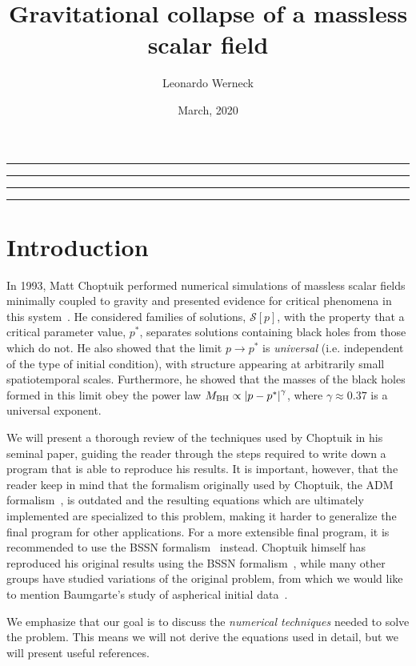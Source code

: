 \documentclass[a4paper,11pt]{article}
\title{Gravitational collapse of a massless scalar field}
\author{Leonardo Werneck}
\date{March, 2020}
\newcommand{\g}{\gamma}
\renewcommand{\S}{\mathcal{S}}
\newcommand{\lrsquare}[1]{\left[ #1 \right]}
\newcommand{\abs}[1]{\left| #1 \right|}
\newcommand{\ctr}[1]{
  \begin{center}
    #1
  \end{center}
}
\begin{document}
\maketitle

\ctr{\rule{\textwidth}{1pt}}
\tableofcontents
\ctr{\rule{\textwidth}{1pt}}
\listoffigures
\ctr{\rule{\textwidth}{1pt}}
\listoftables
\ctr{\rule{\textwidth}{1pt}}


\section{Introduction}

In 1993, Matt Choptuik performed numerical simulations of massless scalar fields minimally coupled to gravity and presented evidence for critical phenomena in this system~\cite{PhysRevLett.70.9}. He considered families of solutions, $\S\lrsquare{p}$, with the property that a critical parameter value, $p^{*}$, separates solutions containing black holes from those which do not. He also showed that the limit $p\to p^{*}$ is \emph{universal} (i.e. independent of the type of initial condition), with structure appearing at arbitrarily small spatiotemporal scales. Furthermore, he showed that the masses of the black holes formed in this limit obey the power law $M_{\rm BH} \propto \abs{p-p^{*}}^{\g}$, where $\g\approx0.37$ is a universal exponent.

We will present a thorough review of the techniques used by Choptuik in his seminal paper, guiding the reader through the steps required to write down a program that is able to reproduce his results. It is important, however, that the reader keep in mind that the formalism originally used by Choptuik, the ADM formalism~\cite{Arnowitt:1959ah}, is outdated and the resulting equations which are ultimately implemented are specialized to this problem, making it harder to generalize the final program for other applications. For a more extensible final program, it is recommended to use the BSSN formalism~\cite{shibata1995evolution,baumgarte1998numerical} instead. Choptuik himself has reproduced his original results using the BSSN formalism~\cite{PhysRevD.92.084037}, while many other groups have studied variations of the original problem, from which we would like to mention Baumgarte's study of aspherical initial data~\cite{Baumgarte_2018}.

We emphasize that our goal is to discuss the \emph{numerical techniques} needed to solve the problem. This means we will not derive the equations used in detail, but we will present useful references.
\end{document}
